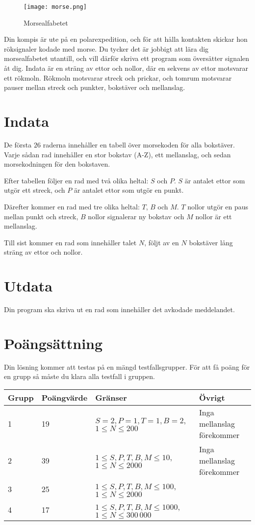 
\begin{figure}[h] 
\begin{center}
\texttt{[image: morse.png]}
\caption{Morsealfabetet}
\end{center} 
\end{figure}

Din kompis är ute på en polarexpedition, och för att hålla kontakten skickar hon röksignaler kodade med morse. Du tycker det är jobbigt att lära dig morsealfabetet utantill, och vill därför skriva ett program som översätter signalen åt dig. Indata är en sträng av ettor och nollor, där en sekvens av ettor motsvarar ett rökmoln. Rökmoln motsvarar streck och prickar, och tomrum motsvarar pauser mellan streck och punkter, bokstäver och mellanslag.

\section*{Indata}
De första $26$ raderna innehåller en tabell över morsekoden för alla bokstäver.
Varje sådan rad innehåller en stor bokstav (A-Z), ett mellanslag, och sedan morsekodningen för den bokstaven.

Efter tabellen följer en rad med två olika heltal: $S$ och $P$.
$S$ är antalet ettor som utgör ett streck, och $P$ är antalet ettor som utgör en punkt.

Därefter kommer en rad med tre olika heltal: $T$, $B$ och $M$.
$T$ nollor utgör en paus mellan punkt och streck, $B$ nollor signalerar ny bokstav och $M$ nollor är ett mellanslag.

Till sist kommer en rad som innehåller talet $N$, följt av en $N$ bokstäver lång sträng av ettor och nollor.

\section*{Utdata}
Din program ska skriva ut en rad som innehåller det avkodade meddelandet.

\section*{Poängsättning}
Din lösning kommer att testas på en mängd testfallsgrupper. För att få poäng för en grupp
så måste du klara alla testfall i gruppen.
\begin{tabular}{| l | l | l | l |}
\hline
Grupp & Poängvärde & Gränser & Övrigt \\ \hline
1     & 19         &  $S = 2, P = 1, T = 1, B = 2$, $1 \le N \le 200$  & Inga mellanslag förekommer\\ \hline
2     & 39         &  $1 \le S, P, T, B, M \le 10$, $1 \le N \le 2000$ & Inga mellanslag förekommer \\ \hline
3     & 25         &  $1 \le S, P, T, B, M \le 100$, $1 \le N \le 2000$    & \\ \hline
4     & 17        &  $1 \le S, P, T, B, M \le 1000$, $1 \le N \le 300\,000$  & \\ \hline
\end{tabular}
